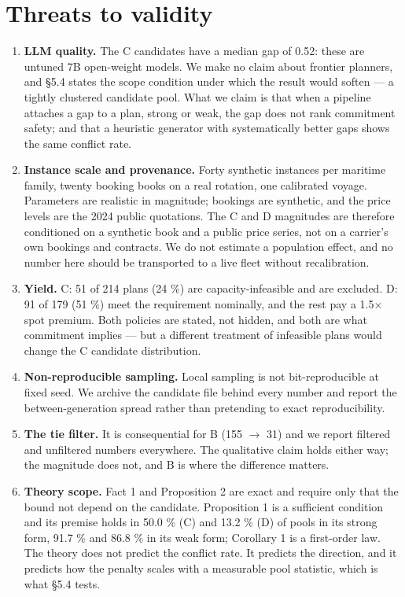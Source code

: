 \documentclass[preprint,12pt,letterpaper]{elsarticle}
\theoremstyle{definition}
\theoremstyle{plain}
\begin{document}
\section{Threats to validity}

\begin{enumerate}
\item \textbf{LLM quality.} The C candidates have a median gap of 0.52: these are untuned 7B open-weight models. We make no claim about frontier planners, and \S 5.4 states the scope condition under which the result would soften --- a tightly clustered candidate pool. What we claim is that when a pipeline attaches a gap to a plan, strong or weak, the gap does not rank commitment safety; and that a heuristic generator with systematically better gaps shows the same conflict rate.
\item \textbf{Instance scale and provenance.} Forty synthetic instances per maritime family, twenty booking books on a real rotation, one calibrated voyage. Parameters are realistic in magnitude; bookings are synthetic, and the price levels are the 2024 public quotations. The C and D magnitudes are therefore conditioned on a synthetic book and a public price series, not on a carrier's own bookings and contracts. We do not estimate a population effect, and no number here should be transported to a live fleet without recalibration.
\item \textbf{Yield.} C: 51 of 214 plans (24 \%) are capacity-infeasible and are excluded. D: 91 of 179 (51 \%) meet the requirement nominally, and the rest pay a 1.5$\times$ spot premium. Both policies are stated, not hidden, and both are what commitment implies --- but a different treatment of infeasible plans would change the C candidate distribution.
\item \textbf{Non-reproducible sampling.} Local sampling is not bit-reproducible at fixed seed. We archive the candidate file behind every number and report the between-generation spread rather than pretending to exact reproducibility.
\item \textbf{The tie filter.} It is consequential for B (155 $\to$ 31) and we report filtered and unfiltered numbers everywhere. The qualitative claim holds either way; the magnitude does not, and B is where the difference matters.
\item \textbf{Theory scope.} Fact 1 and Proposition 2 are exact and require only that the bound not depend on the candidate. Proposition 1 is a sufficient condition and its premise holds in 50.0 \% (C) and 13.2 \% (D) of pools in its strong form, 91.7 \% and 86.8 \% in its weak form; Corollary 1 is a first-order law. The theory does not predict the conflict rate. It predicts the direction, and it predicts how the penalty scales with a measurable pool statistic, which is what \S 5.4 tests.

\end{enumerate}
\end{document}
